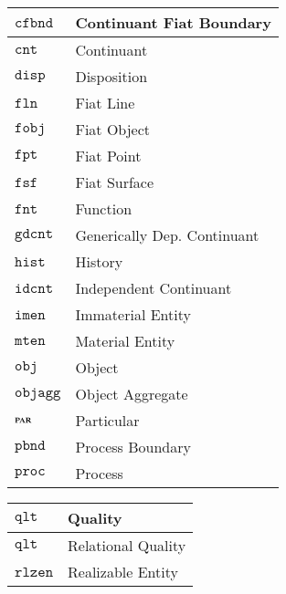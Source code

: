 \documentclass[ao]{iosart2x}
\newcommand{\cn}[1]{\mathtt{#1}}
\newcommand{\bfo}{{\textsc{bfo}}}
\newcommand{\cntbcat}{\cn{cnt}}
\newcommand{\idcntbcat}{\cn{idcnt}}
\newcommand{\gdcntbcat}{\cn{gdcnt}}
\newcommand{\mtenbcat}{\cn{mten}}
\newcommand{\imenbcat}{\cn{imen}}
\newcommand{\objbcat}{\cn{obj}}
\newcommand{\fobjbcat}{\cn{fobj}}
\newcommand{\objaggbcat}{\cn{objagg}}
\newcommand{\cfbndbcat}{\cn{cfbnd}}
\newcommand{\rlzenbcat}{\cn{rlzen}}
\newcommand{\procbcat}{\cn{proc}}
\newcommand{\pbndbcat}{\cn{pbnd}}
\newcommand{\qltbcat}{\cn{qlt}}
\newcommand{\histbcat}{\cn{hist}}
\newcommand{\dispbcat}{\cn{disp}}
\newcommand{\fntbcat}{\cn{fnt}}
\newcommand{\fptbcat}{\cn{fpt}}
\newcommand{\flnbcat}{\cn{fln}}
\newcommand{\fsfbcat}{\cn{fsf}}
\newcommand{\bfopartic}{\textsc{par}}
\begin{document}

\begin{table*}
\caption{Categories of {\bfo}.}\label{table_cat_bfo}
\begin{minipage}{0.43\textwidth}
\hspace{30pt}
\begin{tabular}{|p{}|p{}|}\hline
$\cfbndbcat$ & Continuant Fiat Boundary\\\hline
$\cntbcat$ & Continuant \\\hline
$\dispbcat$ & Disposition \\\hline
$\flnbcat$ & Fiat Line \\\hline
$\fobjbcat$ & Fiat Object \\\hline
$\fptbcat$ & Fiat Point \\\hline
$\fsfbcat$ & Fiat Surface \\\hline
$\fntbcat$ & Function \\\hline
$\gdcntbcat$ & Generically Dep. Continuant \\\hline
$\histbcat$ & History \\\hline
$\idcntbcat$ & Independent Continuant \\\hline
$\imenbcat$ & Immaterial Entity \\\hline
$\mtenbcat$ & Material Entity \\\hline
$\objbcat$ & Object \\\hline
$\objaggbcat$ & Object Aggregate \\\hline
$\bfopartic$ & Particular \\\hline
$\pbndbcat$ & Process Boundary \\\hline
$\procbcat$ & Process  \\\hline
\end{tabular}
\end{minipage}%
\mbox{}\hfill{}
\begin{minipage}{0.43\textwidth}
\hspace{-30pt}\begin{tabular}{|p{}|p{}|}
\hline
$\qltbcat$ & Quality \\\hline
$\qltbcat$ & Relational Quality \\\hline
$\rlzenbcat$ & Realizable Entity \\\hline

\end{tabular}
\end{minipage}
\end{table*}
\end{document}
